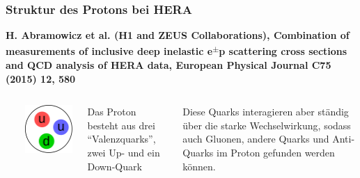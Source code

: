 \documentclass[10pt,t]{beamer}
\begin{document}
\begin{frame}
\frametitle{Struktur des Protons bei HERA}
\vspace*{-2.6\baselineskip}
\alert{\bfseries\footnotesize H. Abramowicz et al. (H1 and ZEUS Collaborations), Combination of measurements of inclusive deep inelastic e\textsuperscript{$\pm$}p scattering cross sections and QCD analysis of HERA data, European Physical Journal C75 (2015) 12, 580 \cite{Abramowicz2015}}
\vspace*{\baselineskip}
\begin{columns}
~\\[-\baselineskip]
\begin{minipage}[c]{0.3\textwidth}
    \includegraphics[width=\textwidth]{hera-proton1}
\end{minipage}
\hfill
\begin{minipage}[c]{0.65\textwidth}\raggedright
    Das Proton besteht aus drei ``Valenzquarks'', zwei Up- und ein Down-Quark
\end{minipage}\vspace*{1ex}

Diese Quarks interagieren aber ständig über die starke Wechselwirkung, sodass auch Gluonen, andere Quarks und Anti-Quarks im Proton gefunden werden können.  


\end{columns}
\end{frame}
\end{document}
